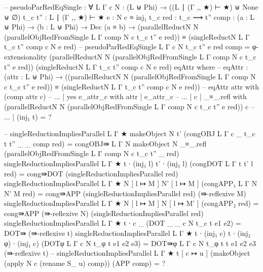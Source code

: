 {\begin{code}
  -- pseudoParRedEqSingle : ∀ {L Γ c} {N : (L ⊎ Phi) → ((L ∣ (Γ ,, ★) ⊢ ★) ⊎ None ⊎ ∅)} {t_c t'' : L ∣ (Γ ,, ★) ⊢ ★} {e : N c ≡ inj₁ t_c} {red : t_c ⟿ t''} {comp : (a : L ⊎ Phi) → (b : L ⊎ Phi) → Dec (a ≡ b)} → (parallelReductN N (parallelObjRedFromSingle {L} {Γ} {comp} N c t_c t'' e red)) ≡ (singleReductN {L} {Γ} {t_c} {t''} {comp} c N e red)
  -- pseudoParRedEqSingle {L} {Γ} {c} {N} {t_c} {t''} {e} {red} {comp} = φ-extensionality (parallelReductN N (parallelObjRedFromSingle {L} {Γ} {comp} N c t_c t'' e red)) (singleReductN {L} {Γ} {t_c} {t''} {comp} c N e red) eqAttr where
  --   eqAttr : (attr : L ⊎ Phi) → ((parallelReductN N (parallelObjRedFromSingle {L} {Γ} {comp} N c t_c t'' e red)) ≡ (singleReductN {L} {Γ} {t_c} {t''} {comp} c N e red))
  --   eqAttr attr with (comp attr c)
  --   ... | yes e_attr_c with attr | e_attr_c
  --   ...   | c | _≡_.refl with (parallelReductN N (parallelObjRedFromSingle {L} {Γ} {comp} N c t_c t'' e red)) c
  --   ...     | (inj₁ t) = ?

  -- singleReductionImpliesParallel {L} {Γ} {★} {makeObject N} {t'} (congOBJ {L} {Γ} {c} {_} {t_c} {t} {t''} {_} {_} {comp} red) = congOBJ⇛ {L} {Γ} {N} {makeObject N} {_≡_.refl} (parallelObjRedFromSingle {L} {Γ} {comp} N c t_c t'' _ red)
  singleReductionImpliesParallel {L} {Γ} {★} {t ∙ (inj₁ l)} {t' ∙ (inj₁ l)} (congDOT {L} {Γ} {t} {t'} {l} red) = cong⇛DOT (singleReductionImpliesParallel red)
  singleReductionImpliesParallel {L} {Γ} {★} {N [ l ↦ M ]} {N' [ l ↦ M ]} (congAPP₁ {L} {Γ} {N} {N'} {M} red) = cong⇛APP (singleReductionImpliesParallel red) (⇛-reflexive M)
  singleReductionImpliesParallel {L} {Γ} {★} {N [ l ↦ M ]} {N [ l ↦ M' ]} (congAPP₂ red) = cong⇛APP (⇛-reflexive N) (singleReductionImpliesParallel red)
  singleReductionImpliesParallel {L} {Γ} {★} { t ∙ c } {_} (DOT {_} {_} {c} {N} {t_c} {t} {e1} {e2}) = DOT⇛ (⇛-reflexive t)
  singleReductionImpliesParallel {L} {Γ} {★} {t ∙ (inj₁ c)} {t ∙ (inj₂ φ) ∙ (inj₁ c)} (DOTφ {L} {Γ} {c} {N} {t_φ} {t} {e1} {e2} {e3}) = DOT⇛φ {L} {Γ} {c} {N} {t_φ} {t} {t} {e1} {e2} {e3} (⇛-reflexive t)
  -- singleReductionImpliesParallel {L} {Γ} {★} {t [ c ↦ u ]} {(makeObject (apply N c (rename S_ u) comp))} (APP comp) = ?

\end{code}}   